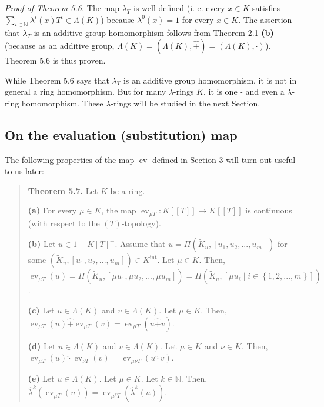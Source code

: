 \documentclass[numbers=enddot,12pt,final,onecolumn,notitlepage]{scrartcl}%
\begin{document}
\textit{Proof of Theorem 5.6.} The map $\lambda_{T}$ is well-defined (i. e.
every $x\in K$ satisfies $\sum\limits_{i\in\mathbb{N}}\lambda^{i}\left(
x\right)  T^{i}\in\Lambda\left(  K\right)  $) because $\lambda^{0}\left(
x\right)  =1$ for every $x\in K$. The assertion that $\lambda_{T}$ is an
additive group homomorphism follows from Theorem 2.1 \textbf{(b)} (because as
an additive group, $\Lambda\left(  K\right)  =\left(  \Lambda\left(  K\right)
,\widehat{+}\right)  =\left(  \Lambda\left(  K\right)  ,\cdot\right)  $).
Theorem 5.6 is thus proven.

While Theorem 5.6 says that $\lambda_{T}$ is an additive group homomorphism,
it is not in general a ring homomorphism. But for many $\lambda$-rings $K$, it
is one - and even a $\lambda$-ring homomorphism. These $\lambda$-rings will be
studied in the next Section.

\subsection{On the evaluation (substitution) map}

The following properties of the map $\operatorname*{ev}$ defined in Section 3
will turn out useful to us later:

\begin{quote}
\textbf{Theorem 5.7.} Let $K$ be a ring.

\textbf{(a)} For every $\mu\in K$, the map $\operatorname*{ev}_{\mu
T}:K\left[  \left[  T\right]  \right]  \rightarrow K\left[  \left[  T\right]
\right]  $ is continuous (with respect to the $\left(  T\right)  $-topology).

\textbf{(b)} Let $u\in1+K\left[  T\right]  ^{+}$. Assume that $u=\Pi\left(
\widetilde{K}_{u},\left[  u_{1},u_{2},...,u_{m}\right]  \right)  $ for some
$\left(  \widetilde{K}_{u},\left[  u_{1},u_{2},...,u_{m}\right]  \right)  \in
K^{\operatorname*{int}}$. Let $\mu\in K$. Then, $\operatorname*{ev}_{\mu
T}\left(  u\right)  =\Pi\left(  \widetilde{K}_{u},\left[  \mu u_{1},\mu
u_{2},...,\mu u_{m}\right]  \right)  =\Pi\left(  \widetilde{K}_{u},\left[  \mu
u_{i}\mid i\in\left\{  1,2,...,m\right\}  \right]  \right)  $.

\textbf{(c)} Let $u\in\Lambda\left(  K\right)  $ and $v\in\Lambda\left(
K\right)  $. Let $\mu\in K$. Then, $\operatorname*{ev}_{\mu T}\left(
u\right)  \widehat{+}\operatorname*{ev}_{\mu T}\left(  v\right)
=\operatorname*{ev}_{\mu T}\left(  u\widehat{+}v\right)  $.

\textbf{(d)} Let $u\in\Lambda\left(  K\right)  $ and $v\in\Lambda\left(
K\right)  $. Let $\mu\in K$ and $\nu\in K$. Then, $\operatorname*{ev}_{\mu
T}\left(  u\right)  \widehat{\cdot}\operatorname*{ev}_{\nu T}\left(  v\right)
=\operatorname*{ev}_{\mu\nu T}\left(  u\widehat{\cdot}v\right)  $.

\textbf{(e)} Let $u\in\Lambda\left(  K\right)  $. Let $\mu\in K$. Let
$k\in\mathbb{N}$. Then, $\widehat{\lambda}^{k}\left(  \operatorname*{ev}_{\mu
T}\left(  u\right)  \right)  =\operatorname*{ev}_{\mu^{k}T}\left(
\widehat{\lambda}^{k}\left(  u\right)  \right)  $.
\end{quote}
\end{document}
